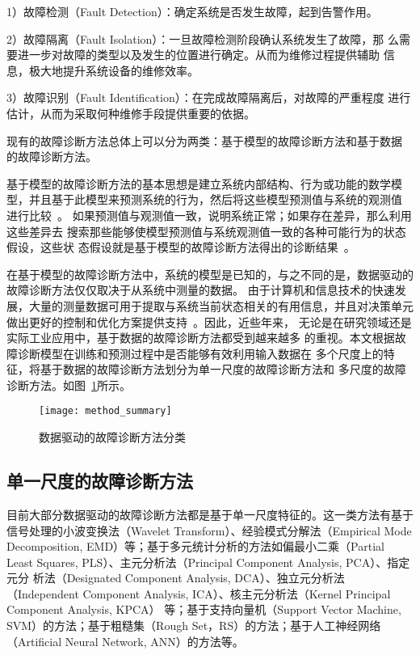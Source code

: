 1）故障检测（Fault Detection）：确定系统是否发生故障，起到告警作用。

2）故障隔离（Fault Isolation）：一旦故障检测阶段确认系统发生了故障，那
么需要进一步对故障的类型以及发生的位置进行确定。从而为维修过程提供辅助
信息，极大地提升系统设备的维修效率。

3）故障识别（Fault Identification）：在完成故障隔离后，对故障的严重程度
进行估计，从而为采取何种维修手段提供重要的依据。

现有的故障诊断方法总体上可以分为两类：基于模型的故障诊断方法和基于数据
的故障诊断方法。

基于模型的故障诊断方法的基本思想是建立系统内部结构、行为或功能的数学模
型，并且基于此模型来预测系统的行为，然后将这些模型预测值与系统的观测值
进行比较~\cite{console1999model, davis1988model, mosterman1998comprehensive}。
如果预测值与观测值一致，说明系统正常；如果存在差异，那么利用这些差异去
搜索那些能够使模型预测值与系统观测值一致的各种可能行为的状态假设，这些状
态假设就是基于模型的故障诊断方法得出的诊断结果~\cite{wotawa2000debugging, friedrich1999model}。

在基于模型的故障诊断方法中，系统的模型是已知的，与之不同的是，数据驱动的
故障诊断方法仅仅取决于从系统中测量的数据。 由于计算机和信息技术的快速发
展，大量的测量数据可用于提取与系统当前状态相关的有用信息，并且对决策单元
做出更好的控制和优化方案提供支持~\cite{yin2012comparison}。因此，近些年来，
无论是在研究领域还是实际工业应用中，基于数据的故障诊断方法都受到越来越多
的重视。本文根据故障诊断模型在训练和预测过程中是否能够有效利用输入数据在
多个尺度上的特征，将基于数据的故障诊断方法划分为单一尺度的故障诊断方法和
多尺度的故障诊断方法。如图~\ref{fig:method_summary}所示。
\begin{figure}[ht]
  \centering
  \texttt{[image: method\_summary]}
  \caption{数据驱动的故障诊断方法分类}
  \label{fig:method_summary}
\end{figure}

\subsection{单一尺度的故障诊断方法}

目前大部分数据驱动的故障诊断方法都是基于单一尺度特征的。这一类方法有基于
信号处理的小波变换法（Wavelet Transform）、经验模式分解法（Empirical Mode
Decomposition, EMD）等；基于多元统计分析的方法如偏最小二乘（Partial Least
Squares, PLS）、主元分析法（Principal Component Analysis, PCA）、指定元分
析法（Designated Component Analysis, DCA）、独立元分析法（Independent Component
Analysis, ICA）、核主元分析法（Kernel Principal Component Analysis, KPCA）
等；基于支持向量机（Support Vector Machine, SVM）的方法；基于粗糙集（Rough
Set，RS）的方法；基于人工神经网络（Artificial Neural Network, ANN）的方法等。

